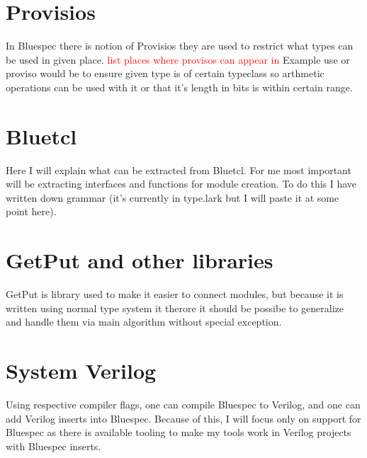 \documentclass[14pt]{article}
\newcommand\todo[1]{\textcolor{red}{#1}}
\begin{document}
\section{Provisios}
    In Bluespec there is notion of Provisios they are used to restrict what types can be used in given place. \todo{list places where provisos can appear in} Example use or proviso would be to ensure given type is of certain typeclass so arthmetic operations can be used with it or that it's length in bits is within certain range.
    
\section{Bluetcl}
    Here I will explain what can be extracted from Bluetcl.
    For me most important will be extracting interfaces and functions for module creation.
    To do this I have written down grammar (it's currently in type.lark but I will paste it at some point here).
    
\section{GetPut and other libraries}
    GetPut is library used to make it easier to connect modules,
    but because it is written using normal type system it therore it should be possibe to generalize and handle them via main algorithm without special exception.

\section{System Verilog}
    Using respective compiler flags, one can compile Bluespec to Verilog, and one can add Verilog inserts into Bluespec. Because of this, I will focus only on support for Bluespec as there is available tooling to make my tools work in Verilog projects with Bluespec inserts.
\end{document}
